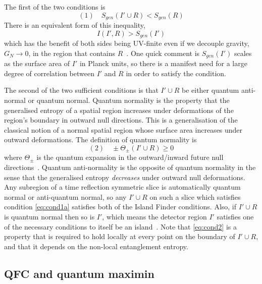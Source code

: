 \documentclass[a4paper,11pt]{article}
\newcommand{\cts}[1]{\ignorespaces}
\def\bne{\begin{equation}}
\def\ene{\end{equation}}
\begin{document}
The first of the two conditions is
\bne \label{eq:cond1a} (1)\quad  S_{gen} (I' \cup R) < S_{gen}(R) \ene
There is an equivalent form of this inequality, 
\bne \label{eq:cond1b}
I(I',R) > S_{gen} (I') 
\ene 
which has the benefit of both sides being UV-finite even if we decouple gravity, $G_N \to 0$, in the region that contains $R$~\cite{Casini2007, Bombelli1986, Hartman2020}. One quick comment is $S_{gen}(I')$ scales as the surface area of $I'$ in Planck units, so there is a manifest need for a large degree of correlation between $I'$ and $R$ in order to satisfy the condition. 

The second of the two sufficient conditions is that $I'\cup R$ be either quantum anti-normal or quantum normal. Quantum normality is the property that the generalised entropy of a spatial region increases under deformations of the region's boundary in outward null directions. This is a generalisation of the classical notion of a normal spatial region whose surface area increases under outward deformations. The definition of quantum normality is 
\bne \label{eq:cond2}
(2) \quad \pm \Theta_\pm (I' \cup R) \geq 0
\ene
where $\Theta_\pm$ is the quantum expansion in the outward/inward future null directions~\cite{Bousso2015}. Quantum anti-normality is the opposite of quantum normality in the sense that the generalised entropy \textit{decreases} under outward null deformations. Any subregion of a time reflection symmetric slice is automatically quantum normal or anti-quantum normal, so any $I' \cup R$ on such a slice which satisfies condition \eqref{eq:cond1a} satisfies both of the Island Finder conditions. Also, if $I' \cup R$ is quantum normal then so is $I'$, which means the detector region $I'$ satisfies one of the necessary conditions to itself be an island~\cite{Almheiri2019a, Hartman2020}.  Note that \eqref{eq:cond2} is a property that is required to hold locally at every point on the boundary of $I' \cup R$, and that it depends on the non-local entanglement entropy.   



\subsection{QFC and quantum maximin}
\end{document}

